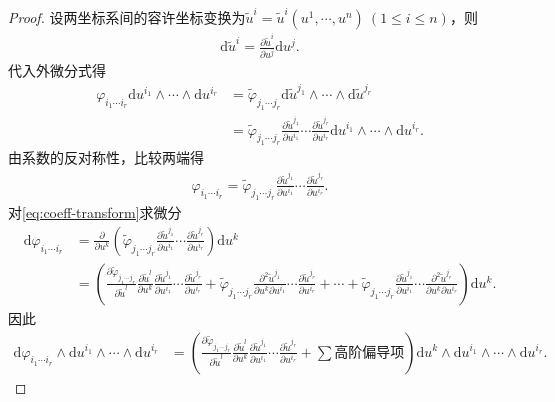 \documentclass[../../main.tex]{subfiles}%
\begin{document}
\begin{proof}

设两坐标系间的容许坐标变换为$\tilde{u}^i=\tilde{u}^i(u^1,\cdots,u^n)\ (1\leqslant i\leqslant n)$，则
\begin{align}
\mathrm{d}\tilde{u}^i = \frac{\partial\tilde{u}^i}{\partial u^j}\mathrm{d}u^j. \label{eq:coord-diff}
\end{align}
代入外微分式得
\begin{align*}
\varphi_{i_1\cdots i_r}\mathrm{d}u^{i_1}\land\cdots\land\mathrm{d}u^{i_r} &= \tilde{\varphi}_{j_1\cdots j_r}\mathrm{d}\tilde{u}^{j_1}\land\cdots\land\mathrm{d}\tilde{u}^{j_r} \\
&= \tilde{\varphi}_{j_1\cdots j_r}\frac{\partial\tilde{u}^{j_1}}{\partial u^{i_1}}\cdots\frac{\partial\tilde{u}^{j_r}}{\partial u^{i_r}}\mathrm{d}u^{i_1}\land\cdots\land\mathrm{d}u^{i_r}.
\end{align*}
由系数的反对称性，比较两端得
\begin{align}
\varphi_{i_1\cdots i_r} = \tilde{\varphi}_{j_1\cdots j_r}\frac{\partial\tilde{u}^{j_1}}{\partial u^{i_1}}\cdots\frac{\partial\tilde{u}^{j_r}}{\partial u^{i_r}}. \label{eq:coeff-transform}
\end{align}
对\eqref{eq:coeff-transform}求微分
\begin{align*}
\mathrm{d}\varphi_{i_1\cdots i_r} &= \frac{\partial}{\partial u^k}\left(\tilde{\varphi}_{j_1\cdots j_r}\frac{\partial\tilde{u}^{j_1}}{\partial u^{i_1}}\cdots\frac{\partial\tilde{u}^{j_r}}{\partial u^{i_r}}\right)\mathrm{d}u^k \\
&= \left(\frac{\partial\tilde{\varphi}_{j_1\cdots j_r}}{\partial\tilde{u}^l}\frac{\partial\tilde{u}^l}{\partial u^k}\frac{\partial\tilde{u}^{j_1}}{\partial u^{i_1}}\cdots\frac{\partial\tilde{u}^{j_r}}{\partial u^{i_r}}+\tilde{\varphi}_{j_1\cdots j_r}\frac{\partial^2\tilde{u}^{j_1}}{\partial u^k\partial u^{i_1}}\cdots\frac{\partial\tilde{u}^{j_r}}{\partial u^{i_r}}+\cdots+\tilde{\varphi}_{j_1\cdots j_r}\frac{\partial\tilde{u}^{j_1}}{\partial u^{i_1}}\cdots\frac{\partial^2\tilde{u}^{j_r}}{\partial u^k\partial u^{i_r}}\right)\mathrm{d}u^k.
\end{align*}
因此
\begin{align*}
\mathrm{d}\varphi_{i_1\cdots i_r}\land\mathrm{d}u^{i_1}\land\cdots\land\mathrm{d}u^{i_r} &= \left(\frac{\partial\tilde{\varphi}_{j_1\cdots j_r}}{\partial\tilde{u}^l}\frac{\partial\tilde{u}^l}{\partial u^k}\frac{\partial\tilde{u}^{j_1}}{\partial u^{i_1}}\cdots\frac{\partial\tilde{u}^{j_r}}{\partial u^{i_r}}+\sum\text{高阶偏导项}\right)\mathrm{d}u^k\land\mathrm{d}u^{i_1}\land\cdots\land\mathrm{d}u^{i_r}.

\end{align*}
\end{proof}
\end{document}
